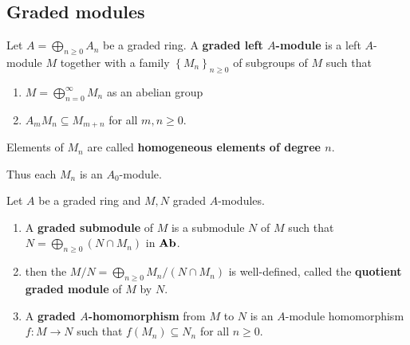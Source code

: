 \subsection{Graded modules}
\begin{definition}
    Let $A=\bigoplus_{n\geq 0} A_n$ be a graded ring.
    A \textbf{graded left $A$-module} is a left $A$-module $M$ together with a family $\left\{M_n\right\}_{n \geqslant 0}$ of subgroups of $M$ such that
    \begin{enumerate}[label=(\roman*)]
        \item
              $M=\bigoplus_{n=0}^{\infty} M_n$ as an abelian group
        \item
              $A_m M_n \subseteq M_{m+n}$ for all $m, n \geqslant 0$.
    \end{enumerate}
    Elements of $M_n$ are called \textbf{homogeneous elements of degree $n$}.
    \begin{remark}
        Thus each $M_n$ is an $A_0$-module.
    \end{remark}
\end{definition}


\begin{definition}
    Let $A$ be a graded ring and $M, N$ graded $A$-modules.
    \begin{enumerate}
        \item
              A \textbf{graded submodule} of $M$ is a submodule $N$ of $M$ such that $N=\bigoplus_{n \geq 0}\left(N \cap M_n\right)$ in $\mathbf{Ab}$.
        \item
              then the $M / N=\bigoplus_{n \geq 0} M_n /\left(N \cap M_n\right)$ is well-defined, called the \textbf{quotient graded module} of $M$ by $N$.
        \item
              A \textbf{graded $A$-homomorphism} from $M$ to $N$ is an $A$-module homomorphism $f: M \rightarrow N$ such that $f\left(M_n\right) \subseteq N_n$ for all $n \geqslant 0$.
    \end{enumerate}
\end{definition}

